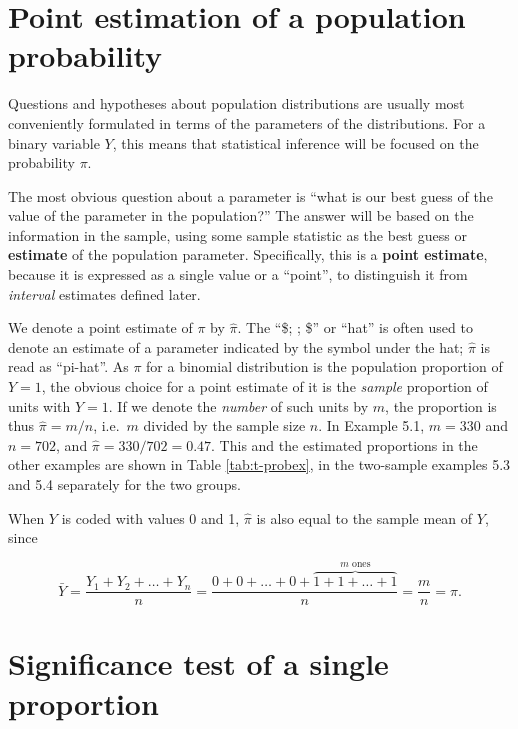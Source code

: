 \documentclass[11pt,a4paper,openany]{book}
\begin{document}
\section{Point estimation of a population
probability}\label{s-probs-pointest}

Questions and hypotheses about population distributions are usually most
conveniently formulated in terms of the parameters of the distributions.
For a binary variable \(Y\), this means that statistical inference will
be focused on the probability \(\pi\).

The most obvious question about a parameter is ``what is our best guess
of the value of the parameter in the population?'' The answer will be
based on the information in the sample, using some sample statistic as
the best guess or \textbf{estimate} of the population parameter.
Specifically, this is a \textbf{point estimate}, because it is expressed
as a single value or a ``point'', to distinguish it from \emph{interval}
estimates defined later.

We denote a point estimate of \(\pi\) by \(\hat{\pi}\). The ``\$;
\hat{\;} ; \$'' or ``hat'' is often used to denote an estimate of a
parameter indicated by the symbol under the hat; \(\hat{\pi}\) is read
as ``pi-hat''. As \(\pi\) for a binomial distribution is the population
proportion of \(Y=1\), the obvious choice for a point estimate of it is
the \emph{sample} proportion of units with \(Y=1\). If we denote the
\emph{number} of such units by \(m\), the proportion is thus
\(\hat{\pi}=m/n\), i.e.~\(m\) divided by the sample size \(n\). In
Example 5.1, \(m=330\) and \(n=702\), and \(\hat{\pi}=330/702=0.47\).
This and the estimated proportions in the other examples are shown in
Table \ref{tab:t-probex}, in the two-sample examples 5.3 and 5.4
separately for the two groups.

When \(Y\) is coded with values 0 and 1, \(\hat{\pi}\) is also equal to
the sample mean of \(Y\), since

\begin{equation}\bar{Y}=\frac{Y_{1}+Y_{2}+\dots+Y_{n}}{n}=
\frac{0+0+\dots+0+\overbrace{1+1+\dots+1}^{m \text{ ones}}}{n}=
\frac{m}{n}=\hat{\pi}.
\label{eq:pihat-as-ybar}\end{equation}

\section{Significance test of a single
proportion}\label{s-probs-test1sample}
\end{document}
